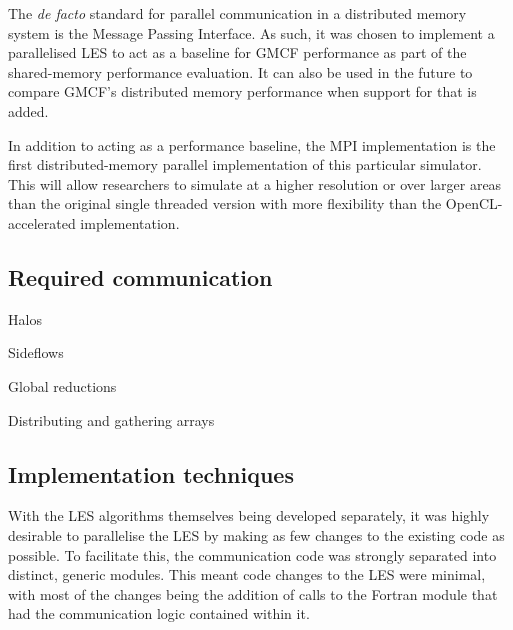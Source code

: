 The \textit{de facto} standard for parallel communication in a distributed
memory system is the Message Passing Interface. As such, it was chosen to
implement a parallelised LES to act as a baseline for GMCF performance as part
of the shared-memory performance evaluation. It can also be used in the future
to compare GMCF's distributed memory performance when support for that is added.

In addition to acting as a performance baseline, the MPI implementation is the
first distributed-memory parallel implementation of this particular simulator.
This will allow researchers to simulate at a higher resolution or over larger
areas than the original single threaded version with more flexibility than the
OpenCL-accelerated implementation.

\subsection{Required communication}



Halos

Sideflows

Global reductions

Distributing and gathering arrays

\subsection{Implementation techniques}

With the LES algorithms themselves being developed separately, it was highly
desirable to parallelise the LES by making as few changes to the existing code
as possible. To facilitate this, the communication code was strongly separated
into distinct, generic modules. This meant code changes to the LES were minimal,
with most of the changes being the addition of calls to the Fortran module that
had the communication logic contained within it.
